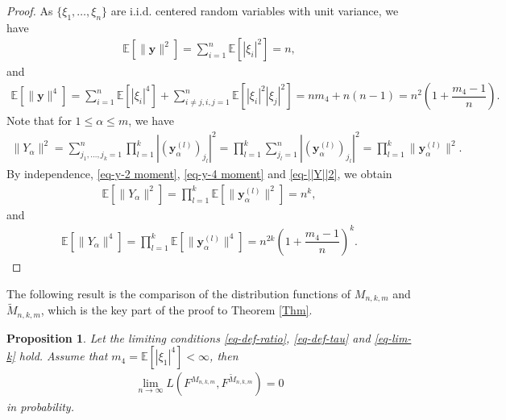 \documentclass[12pt]{article}
\numberwithin{equation}{section} \theoremstyle{plain}
\newtheorem{proposition}{Proposition}[section]
\def\bE{\mathbb E}
\def\y{\mathbf y}
\begin{document}
\begin{proof}
As $\{\xi_1,\ldots,\xi_n\}$ are i.i.d. centered random variables with unit variance, we have
\begin{align} \label{eq-y-2 moment}
    \bE \left[ \|\y\|^2 \right]
    = \sum_{i=1}^n \bE \left[ |\xi_i|^2 \right]
    = n,
\end{align}
and
\begin{align} \label{eq-y-4 moment}
    \bE \left[ \|\y\|^4 \right]
    = \sum_{i=1}^n \bE \left[ |\xi_i|^4 \right] + \sum_{i\not=j,i,j=1}^n \bE \left[ |\xi_i|^2 |\xi_j|^2 \right]
    = n m_4 + n(n-1)
    = n^2 \left( 1 + \dfrac{m_4-1}{n} \right).
\end{align}
Note that for $1 \le \alpha \le m$, we have
\begin{align} \label{eq-||Y||2}
    \|Y_\alpha\|^2
    = \sum_{j_1,\ldots,j_k=1}^n \prod_{l=1}^k \left| \left( \y_\alpha^{(l)} \right)_{j_l} \right|^2
    = \prod_{l=1}^k \sum_{j_l=1}^n \left| \left( \y_\alpha^{(l)} \right)_{j_l} \right|^2
    = \prod_{l=1}^k \| \y_\alpha^{(l)} \|^2.
\end{align}
By independence, \eqref{eq-y-2 moment}, \eqref{eq-y-4 moment} and \eqref{eq-||Y||2}, we obtain
\begin{align*}
    \bE \left[ \|Y_\alpha\|^2 \right]
    = \prod_{l=1}^k \bE \left[ \| \y_\alpha^{(l)} \|^2 \right]
    = n^k,
\end{align*}
and
\begin{align*}
    \bE \left[ \|Y_\alpha\|^4 \right]
    = \prod_{l=1}^k \bE \left[ \| \y_\alpha^{(l)} \|^4 \right]
    = n^{2k} \left( 1 + \dfrac{m_4-1}{n} \right)^k.
\end{align*}
\end{proof}

The following result is the comparison of the distribution functions of $M_{n,k,m}$ and $\widetilde M_{n,k,m}$, which is the key part of the proof to Theorem \ref{Thm}.

\begin{proposition} \label{Prop-compare}
Let the limiting conditions \eqref{eq-def-ratio}, \eqref{eq-def-tau} and \eqref{eq-lim-k} hold.
Assume that $m_4 = \bE[|\xi_1|^4] < \infty$, then
\begin{align*}
    \lim_{n \to \infty} L \left( F^{M_{n,k,m}}, F^{\widetilde M_{n,k,m}} \right)
    = 0 
\end{align*}
in probability.
\end{proposition}
\end{document}
